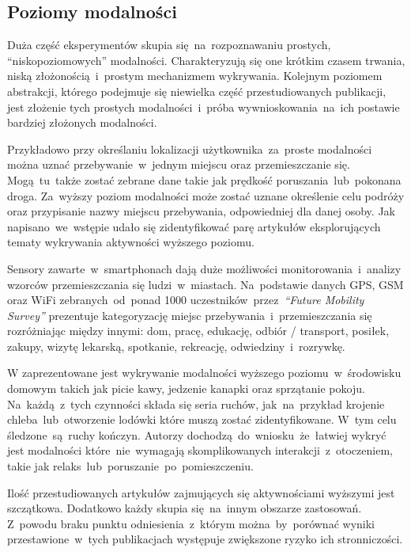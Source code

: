 \subsection{Poziomy modalności}
\label{sec:modality_levels}
Duża część eksperymentów skupia się~na~rozpoznawaniu prostych, ``niskopoziomowych'' modalności. Charakteryzują się one krótkim czasem trwania, niską złożonością~i~prostym mechanizmem wykrywania. Kolejnym poziomem abstrakcji, którego podejmuje się niewielka część przestudiowanych publikacji, jest złożenie tych prostych modalności~i~próba wywnioskowania~na~ich postawie bardziej złożonych modalności.

Przykładowo przy określaniu lokalizacji użytkownika~za~proste modalności można uznać przebywanie~w~jednym miejscu oraz przemieszczanie się. Mogą~tu~także zostać zebrane dane takie jak prędkość poruszania~lub~pokonana droga. Za~wyższy poziom modalności może zostać uznane określenie celu podróży oraz przypisanie nazwy miejscu przebywania, odpowiedniej dla danej osoby. Jak napisano~we~wstępie udało się zidentyfikować parę artykułów eksplorujących tematy wykrywania aktywności wyższego poziomu.
\pagebreak

Sensory zawarte~w~smartphonach dają duże możliwości monitorowania~i~analizy wzorców przemieszczania się ludzi~w~miastach. Na~podstawie danych GPS, GSM oraz WiFi zebranych~od~ponad 1000 uczestników~przez~\textit{``Future Mobility Survey''} \cite{S26} prezentuje kategoryzację miejsc przebywania~i~przemieszczania się rozróżniając między innymi: dom, pracę, edukację, odbiór / transport, posiłek, zakupy, wizytę lekarską, spotkanie, rekreację, odwiedziny~i~rozrywkę.

W \cite{S38} zaprezentowane jest wykrywanie modalności wyższego poziomu~w~środowisku domowym takich jak picie kawy, jedzenie kanapki oraz sprzątanie pokoju. Na~każdą~z~tych czynności składa się seria ruchów, jak~na~przykład krojenie chleba~lub~otworzenie lodówki które muszą zostać zidentyfikowane. W~tym celu śledzone~są~ruchy kończyn. Autorzy dochodzą~do~wniosku~że~łatwiej wykryć jest modalności które~nie~wymagają skomplikowanych interakcji~z~otoczeniem, takie jak relaks~lub~poruszanie~po~pomieszczeniu.

Ilość przestudiowanych artykułów zajmujących się aktywnościami wyższymi jest szczątkowa. Dodatkowo każdy skupia się~na~innym obszarze zastosowań. Z~powodu braku punktu odniesienia~z~którym można~by~porównać wyniki przestawione~w~tych publikacjach występuje zwiększone ryzyko ich stronniczości. 

